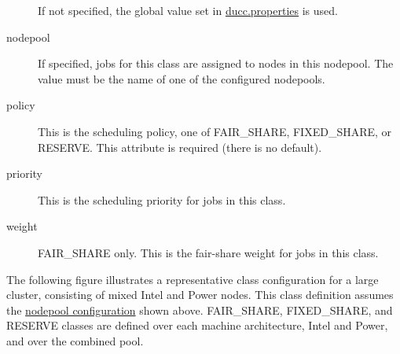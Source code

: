 \begin{description}
        If not specified, the global value set in \hyperref[sec:ducc.properties]{ducc.properties} is used.

      \item[nodepool] If specified, jobs for this class are assigned to nodes in this nodepool. The
        value must be the name of one of the configured nodepools.

      \item[policy] This is the scheduling policy, one of FAIR\_SHARE, FIXED\_SHARE, or RESERVE. This
        attribute is required (there is no default).

      \item[priority] This is the scheduling priority for jobs in this class.

      \item[weight] FAIR\_SHARE only. This is the fair-share weight for jobs in this class.
      
    \end{description}

    The following figure illustrates a representative class configuration for a large cluster,
    consisting of mixed Intel and Power nodes.  This class definition assumes the
    \hyperref[fig:nodepool.configuration]{nodepool configuration} shown above.  FAIR\_SHARE,
    FIXED\_SHARE, and RESERVE classes are defined over each machine architecture, Intel and Power,
    and over the combined pool. 

